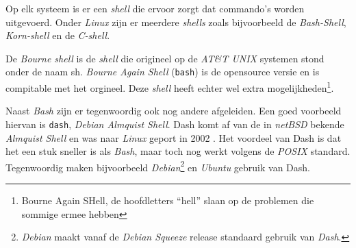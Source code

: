 Op elk systeem is er een \emph{shell} die ervoor zorgt dat commando's worden uitgevoerd. Onder \emph{Linux} zijn er meerdere \emph{shells} zoals bijvoorbeeld de \emph{Bash-Shell}, \emph{Korn-shell} en de \emph{C-shell}.

De \emph{Bourne shell} is de \emph{shell} die origineel op de \emph{AT\&T UNIX} systemen stond onder de naam sh. \emph{Bourne Again Shell} (\texttt{bash}) is de opensource versie en is compitable met het orgineel. Deze \emph{shell} heeft echter wel extra mogelijkheden\footnote{Bourne Again SHell, de hoofdletters ``hell'' slaan op de problemen die sommige ermee hebben}.

Naast \emph{Bash} zijn er tegenwoordig ook nog andere afgeleiden. Een goed voorbeeld hiervan is \texttt{dash}, \emph{Debian Almquist Shell}. Dash komt af van de in \emph{netBSD} bekende \emph{Almquist Shell} en was naar \emph{Linux} geport in 2002 \cite{bib.dash}. Het voordeel van Dash is dat het een stuk sneller is als \emph{Bash}, maar toch nog werkt volgens de \emph{POSIX} standard. Tegenwoordig maken bijvoorbeeld \emph{Debian}\footnote{\emph{Debian} maakt vanaf de \emph{Debian Squeeze} release standaard gebruik van \emph{Dash}.} en \emph{Ubuntu} gebruik van Dash.

